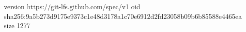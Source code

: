 version https://git-lfs.github.com/spec/v1
oid sha256:9a5b273d9175e9373c1e48d3178a1c70e6912d2fd23058b09b6b85588e4465ea
size 1277
